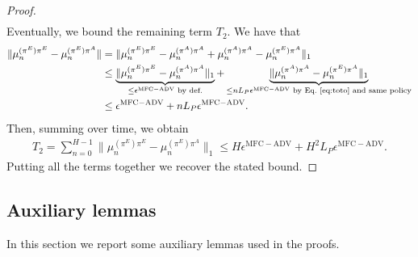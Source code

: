 \documentclass{article}
\begin{document}
\begin{proof}
\begin{align}
\end{align}
Eventually, we bound the remaining term $T_2$. We have that
\begin{align}
    \|\mu_n^{(\pi^E)\pi^E} - \mu_n^{(\pi^E)\pi^A} \| &= \|\mu_n^{(\pi^E)\pi^E} - \mu_n^{(\pi^A)\pi^A} + \mu_n^{(\pi^A)\pi^A} - \mu_n^{(\pi^E)\pi^A}\|_1
    \\
    &\leq \underbrace{\|\mu_n^{(\pi^E)\pi^E} - \mu_n^{(\pi^A)\pi^A}\|_1}_{\leq \epsilon^{\mathrm{MFC-ADV}} \text{ by def.}} + \underbrace{\|\mu_n^{(\pi^A)\pi^A} - \mu_n^{(\pi^E)\pi^A}\|_1}_{\leq nL_P\epsilon^{\mathrm{MFC-ADV}} \text{ by Eq.~\eqref{eq:toto} and same policy}}
    \\
    &\le \epsilon^{\mathrm{MFC-ADV}} + nL_P\epsilon^{\mathrm{MFC-ADV}}.
\end{align}
Then, summing over time, we obtain
\begin{align}
    T_2 = \sum_{n=0}^{H-1} \|\mu_n^{(\pi^E)\pi^E} - \mu_n^{(\pi^E)\pi^A} \|_1 \le H\epsilon^{\mathrm{MFC-ADV}} + H^2L_P\epsilon^{\mathrm{MFC-ADV}}.
\end{align}
Putting all the terms together we recover the stated bound.
\end{proof}
\subsection{Auxiliary lemmas}
\label{sec:aux_lemmas}
In this section we report some auxiliary lemmas used in the proofs. 
\end{document}
